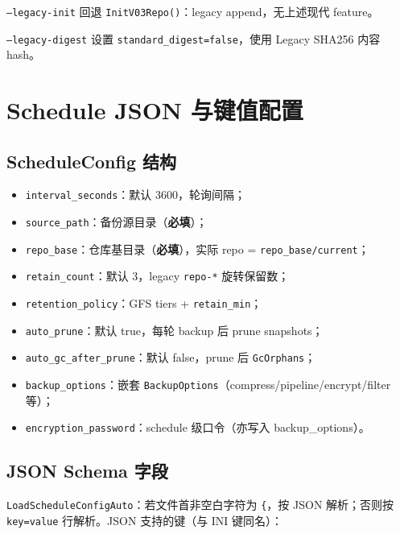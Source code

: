\texttt{--legacy-init} 回退 \texttt{InitV03Repo()}：legacy  append，无上述现代 feature。

\texttt{--legacy-digest} 设置 \texttt{standard\_digest=false}，使用 Legacy SHA256 内容 hash。

\section{Schedule JSON 与键值配置}

\subsection{ScheduleConfig 结构}

\begin{structbox}[ScheduleConfig 字段]
\begin{itemize}[nosep]
  \item \texttt{interval\_seconds}：默认 3600，轮询间隔；
  \item \texttt{source\_path}：备份源目录（\textbf{必填}）；
  \item \texttt{repo\_base}：仓库基目录（\textbf{必填}），实际 repo = \texttt{repo\_base/current}；
  \item \texttt{retain\_count}：默认 3，legacy \texttt{repo-*} 旋转保留数；
  \item \texttt{retention\_policy}：GFS tiers + \texttt{retain\_min}；
  \item \texttt{auto\_prune}：默认 true，每轮 backup 后 prune snapshots；
  \item \texttt{auto\_gc\_after\_prune}：默认 false，prune 后 \texttt{GcOrphans}；
  \item \texttt{backup\_options}：嵌套 \texttt{BackupOptions}（compress/pipeline/encrypt/filter 等）；
  \item \texttt{encryption\_password}：schedule 级口令（亦写入 backup\_options）。
\end{itemize}
\end{structbox}

\subsection{JSON Schema 字段}

\texttt{LoadScheduleConfigAuto}：若文件首非空白字符为 \texttt{\{}，按 JSON 解析；否则按 \texttt{key=value} 行解析。JSON 支持的键（与 INI 键同名）：

